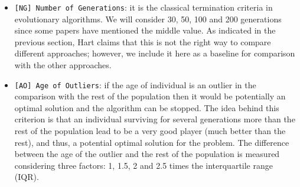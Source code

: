\documentclass[runningheads,a4paper]{llncs}
\begin{document}
\begin{itemize}
    \item \texttt{[NG] Number of Generations}: it is the classical termination
      criteria in evolutionary algorithms. We will consider 30, 50, 100 and 200 generations since some papers \cite{EvoStar2014:GPBot:anon} have mentioned the middle value. As indicated in the previous section,
      Hart \cite{Hart1996} claims that this is not the right way to
      compare different approaches; however, we include it here as a
      baseline for comparison with the other approaches. %

    \item \texttt{[AO] Age of Outliers}: if the age of individual is an outlier in the comparison with the rest of the population then it would be potentially an optimal solution and the algorithm can be stopped. %
The idea behind this criterion is that an individual surviving for several generations more than the rest of the population lead to be a very good player (much better than the rest), and thus, a potential optimal solution for the problem. The difference between the age of the outlier and the rest of the population is measured considering three factors: 1, 1.5, 2 and 2.5 times the interquartile range (IQR). %


\end{itemize}
\end{document}
